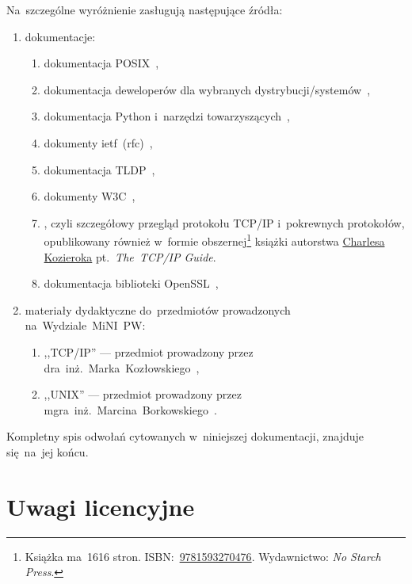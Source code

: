 \documentclass[thesis]{subfiles}
\begin{document}
\noindent Na~szczególne wyróżnienie zasługują następujące źródła:\mynobreakpar
\begin{enumerate}
	\item dokumentacje:\mynobreakpar
	\begin{enumerate}
		\item dokumentacja POSIX~\cite{posix},
		\item dokumentacja deweloperów dla wybranych dystrybucji/systemów~\cite{archlinux-wiki,gentoo-wiki},
		\item dokumentacja Python i~narzędzi towarzyszących~\cite{python-doc},%
		\item dokumenty \gls{ietf}~(\gls{rfc})~\cite{rfc-editor},
		\item dokumentacja TLDP~\cite{tldp},
		\item dokumenty W3C~\cite{w3c},
		\item {}, czyli szczegółowy przegląd protokołu TCP/IP i~pokrewnych protokołów, opublikowany również w~formie obszernej\footnote{Książka ma~1616 stron. ISBN:~\href{https://www.nostarch.com/tcpip.htm}{9781593270476}. Wydawnictwo: \emph{No Starch Press}.} książki autorstwa \href{https://www.linkedin.com/in/charles-kozierok-708112/}{\mbox{Charlesa} \mbox{Kozieroka}} pt.~\emph{The~TCP/IP Guide}.
		\item dokumentacja biblioteki OpenSSL~\cite{openssl-doc},
	\end{enumerate}
	\item materiały dydaktyczne do~przedmiotów prowadzonych na~Wydziale~MiNI~PW:\mynobreakpar
	\begin{enumerate}
		\item ,,TCP/IP'' --- przedmiot prowadzony przez dra~inż.~Marka~Kozłowskiego~\cite{kozlowski},
		\item ,,UNIX'' --- przedmiot prowadzony przez mgra~inż.~Marcina~Borkowskiego~\cite{borkowski}.
	\end{enumerate}
\end{enumerate}
Kompletny spis odwołań cytowanych w~niniejszej dokumentacji, znajduje się~na~jej końcu. %


\section{Uwagi licencyjne}
\end{document}
